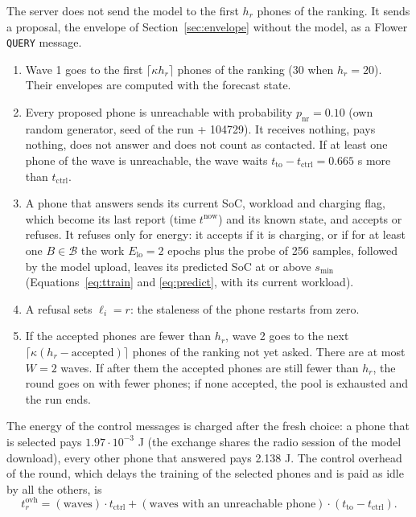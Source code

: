 \documentclass[11pt,a4paper]{article}
\newcommand{\cf}[1]{\texttt{#1}}
\begin{document}
The server does not send the model to the first $h_r$ phones of the ranking.
It sends a proposal, the envelope of Section~\ref{sec:envelope} without the
model, as a Flower \cf{QUERY} message.
\begin{enumerate}
  \item Wave 1 goes to the first $\lceil \kappa h_r \rceil$ phones of the
        ranking (30 when $h_r = 20$). Their envelopes are computed with the
        forecast state.
  \item Every proposed phone is unreachable with probability $p_{\mathrm{nr}} =
        0.10$ (own random generator, seed of the run + 104729). It receives
        nothing, pays nothing, does not answer and does not count as
        contacted. If at least one phone of the wave is unreachable, the wave
        waits $t_{\mathrm{to}} - t_{\mathrm{ctrl}} = 0.665$ s more than
        $t_{\mathrm{ctrl}}$.
  \item A phone that answers sends its current SoC, workload and charging
        flag, which become its last report (time $t^{\mathrm{now}}$) and its
        known state, and accepts or refuses. It refuses only for energy: it
        accepts if it is charging, or if for at least one $B \in \mathcal{B}$
        the work $E_{\mathrm{lo}} = 2$ epochs plus the probe of 256 samples,
        followed by the model upload, leaves its predicted SoC at or above
        $s_{\min}$ (Equations~\eqref{eq:ttrain} and \eqref{eq:predict}, with its
        current workload).
  \item A refusal sets $\ell_i = r$: the staleness of the phone restarts from
        zero.
  \item If the accepted phones are fewer than $h_r$, wave 2 goes to the next
        $\lceil \kappa (h_r - \text{accepted}) \rceil$ phones of the ranking
        not yet asked. There are at most $W = 2$ waves. If after them the
        accepted phones are still fewer than $h_r$, the round goes on with
        fewer phones; if none accepted, the pool is exhausted and the run
        ends.
\end{enumerate}

The energy of the control messages is charged after the fresh choice: a phone
that is selected pays $1.97 \cdot 10^{-3}$ J (the exchange shares the radio
session of the model download), every other phone that answered pays 2.138 J.
The control overhead of the round, which delays the training of the selected
phones and is paid as idle by all the others, is
\begin{equation}
  t^{\mathrm{ovh}}_r = (\text{waves}) \cdot t_{\mathrm{ctrl}}
                     + (\text{waves with an unreachable phone}) \cdot (t_{\mathrm{to}} - t_{\mathrm{ctrl}}) .
\end{equation}
\end{document}
